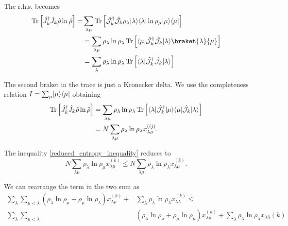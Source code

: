 The r.h.s. becomes
\begin{equation}
    \begin{split}
        \Tr\left[\hat J_{k}^\dagger \hat J_{k}\hat\rho\ln\hat\rho\right]=& \sum_{\lambda\mu}\Tr\left[\hat{\mathcal{J}}_{k}^\dagger \hat{\mathcal{J}}_{k}\rho_\lambda\ket{\lambda}\bra{\lambda}\ln\rho_\mu\ket{\mu}\bra{\mu}\right]\\
        & = \sum_{\lambda\mu}\rho_\lambda\ln\rho_\lambda\Tr\left[\bra{\mu}\hat{\mathcal{J}}_{k}^\dagger\hat{\mathcal{J}}_{k}\ket{\lambda}\braket{\lambda}{\mu}\right]\\
        &= \sum_{\lambda}\rho_\lambda\ln\rho_\lambda\Tr\left[\bra{\lambda}\hat{\mathcal{J}}_{k}^\dagger\hat{\mathcal{J}}_{k}\ket{\lambda}\right]\\
    \end{split}
\end{equation}

The second braket in the trace is just a Kronecker delta. We use the completeness relation $I = \sum_\mu\lvert\mu\rangle\langle\mu\rvert$ obtaining
\begin{equation}
    \begin{split}
        \operatorname{Tr}\left[\hat J_{k}^\dagger \hat J_{k}\hat\rho\ln\hat\rho\right]&= \sum_{\lambda\mu}\rho_\lambda\ln\rho_\lambda\operatorname{Tr}\left[\langle\lambda\rvert\hat{\mathcal{J}}_{k}^\dagger\lvert\mu\rangle\langle\mu\rvert\hat{\mathcal{J}}_{k}\lvert\lambda\rangle\right]\\
        &= N\sum_{\lambda\mu}\rho_\lambda\ln\rho_\lambda x^{(ij)}_{\lambda\mu}.\\
    \end{split}
\end{equation}


The inequality \eqref{reduced_entropy_inequality} reduces to 
\begin{equation}
    N \sum_{\lambda\mu}\rho_\lambda\ln\rho_\mu x^{(k)}_{\lambda\mu} \leq N\sum_{\lambda\mu}\rho_\lambda\ln\rho_\lambda x^{(k)}_{\lambda\mu}.
\end{equation}

We can rearrange the term in the two sum as
\begin{equation}
    \begin{split}
        \sum_{\lambda}\sum_{\mu<\lambda}\left(\rho_\lambda\ln\rho_\mu + \rho_\mu\ln\rho_\lambda \right) x^{(k)}_{\lambda\mu} +&\sum_\lambda \rho_\lambda\ln\rho_\lambda x^{(k)}_{\lambda\lambda} \leq\\ 
        \sum_{\lambda}\sum_{\mu<\lambda}&\left(\rho_\lambda\ln\rho_\lambda+ \rho_\mu\ln\rho_\mu\right)x^{(k)}_{\lambda\mu} + \sum_{\lambda}\rho_\lambda\ln\rho_\lambda x_{\lambda\lambda}{(k)} 
    \end{split}
\end{equation}

